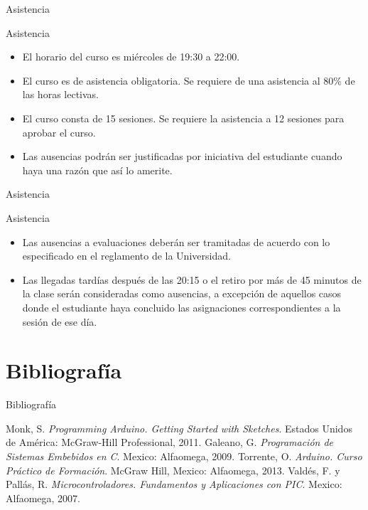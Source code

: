 \documentclass[handout,xcolor=dvipsnames]{beamer}
\newcommand{\pageframe}[1]{\frame{\begin{center}{ \Huge #1 }\end{center}}}
\begin{document}
\begin{frame}{Asistencia}
\begin{block}{Asistencia}
  \begin{itemize}[<+->]
  	\item El horario del curso es miércoles de 19:30 a 22:00.
    \item El curso es de asistencia obligatoria. Se requiere de una asistencia al 80\% de las horas lectivas.
    \item El curso consta de 15 sesiones. Se requiere la asistencia a 12 sesiones para aprobar el curso.
    \item Las ausencias podrán ser justificadas por iniciativa del estudiante cuando haya una razón que así lo amerite.
  \end{itemize}
\end{block}
\end{frame}

\begin{frame}{Asistencia}
\begin{block}{Asistencia}
  \begin{itemize}[<+->]
	\item Las ausencias a evaluaciones deberán ser tramitadas de acuerdo con lo especificado en el reglamento de la Universidad.
    \item Las llegadas tardías después de las 20:15 o el retiro por más de 45 minutos de la clase serán consideradas como ausencias, a excepción de aquellos casos donde el estudiante haya concluido las asignaciones correspondientes a la sesión de ese día.
  \end{itemize}
\end{block}
\end{frame}

\section{Bibliografía}

\pageframe{Bibliografía}
\nocite{*}

\begin{frame}{Bibliografía}

\begin{thebibliography}{5}
  Monk, S. 
  \textit{Programming Arduino. Getting Started with Sketches}.
  Estados Unidos de América: McGraw-Hill Professional,
  2011.
  Galeano, G.
  \textit{Programación de Sistemas Embebidos en C}.
  Mexico: Alfaomega,
  2009.
  Torrente, O.
  \textit{Arduino. Curso Práctico de Formación}.
  McGraw Hill,
  Mexico: Alfaomega,
  2013.
  Valdés, F. y Pallás, R.
  \textit{Microcontroladores. Fundamentos y Aplicaciones con PIC}.
  Mexico: Alfaomega,
  2007.
\end{thebibliography}

\end{frame}
\end{document}
